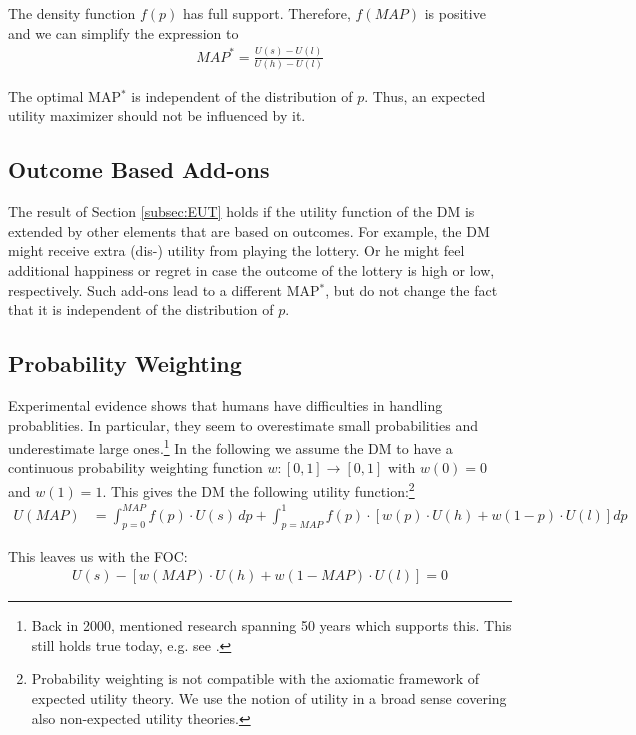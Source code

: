 The density function $f(p)$ has full support.
Therefore, $f(\textit{MAP})$ is positive and we can simplify the expression to 
\begin{align}
	\textit{MAP}^* = \frac{U(s)-U(l)}{U(h)-U(l)}
\end{align}

The optimal MAP$^*$ is independent of the distribution of $p$.
Thus, an expected utility maximizer should not be influenced by it. 


\subsection{Outcome Based Add-ons}

The result of Section \ref{subsec:EUT} holds if the utility function of the DM is extended by other elements that are based on outcomes.
For example, the DM might receive extra \mbox{(dis-)} utility from playing the lottery.
Or he might feel additional happiness or regret in case the outcome of the lottery is high or low, respectively.
Such add-ons lead to a different MAP$^*$, but do not change the fact that it is independent of the distribution of $p$.  


\subsection{Probability Weighting}

Experimental evidence shows that humans have difficulties in handling probablities.
In particular, they seem to overestimate small probabilities and underestimate large ones.\footnote{
Back in 2000, \citet[p.~348--349]{Starmer2000} mentioned research spanning 50 years which supports this.
This still holds true today, e.g. see \citet[Figure 4 on p.~276]{Li2020a}.  
} 
In the following we assume the DM to have a continuous probability weighting function $w: [0,1] \rightarrow [0,1]$ with $w(0) = 0$ and $w(1) = 1$.
This gives the DM the following utility function:\footnote{
Probability weighting is not compatible with the axiomatic framework of expected utility theory.
We use the notion of utility in a broad sense covering also non-expected utility theories.
}
\begin{align}
	U(\textit{MAP}) &= \int_{p=0}^{\textit{MAP}} f(p) \cdot U(s) \, dp %
	+ \int_{p=\textit{MAP}}^1 f(p) \cdot \left[w(p) \cdot U(h) + w(1-p) \cdot U(l) \right] dp
\end{align}

This leaves us with the FOC:
\begin{align}
	\label{eq:FOCsimplified}
	U(s) - \left[w(\textit{MAP}) \cdot U(h) + w(1-\textit{MAP}) \cdot U(l) \right] = 0 
\end{align}

